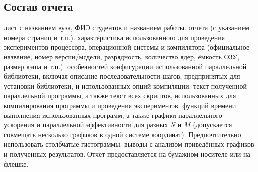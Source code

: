 \subsection{Состав отчета}
\begin{enumerate}
     лист с названием вуза, ФИО студентов и названием работы.
     отчета (с указанием номера страниц и т.п.).
     характеристика использованного для проведения экспериментов процессора, операционной системы и компилятора (официальное название, номер версии/модели, разрядность, количество ядер, ёмкость ОЗУ, размер кэша и т.п.).
     особенностей конфигурации использованной параллельной библиотеки, включая описание последовательности шагов, предпринятых для установки библиотеки, и использованных опций компиляции.
     текст полученной параллельной программы, а также текст всех скриптов, использованных для компилирования программы и проведения экспериментов.
     функций времени выполнения использованных программ, а также графики параллельного ускорения и параллельной эффективности для разных $N$ и $M$ (допускается совмещать несколько графиков в одной системе координат). Предпочтительно использовать столбчатые гистограммы.
     выводы с анализом приведённых графиков и полученных результатов. Отчёт предоставляется на бумажном носителе или на флешке.
\end{enumerate}

